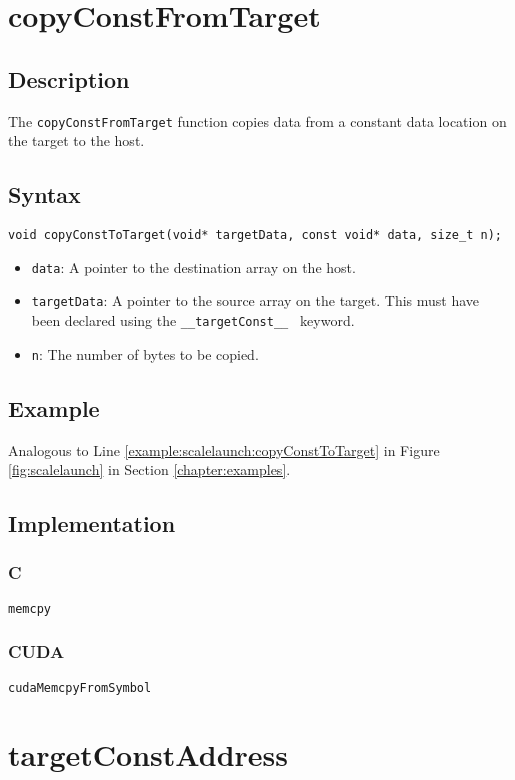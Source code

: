 \newpage
\section{copyConstFromTarget}

\subsection{Description}

The \verb+copyConstFromTarget+ function copies data from a constant data location on the target to the host.

\subsection{Syntax}
\begin{verbatim}
void copyConstToTarget(void* targetData, const void* data, size_t n);
\end{verbatim}

\begin{itemize}
\item \verb+data+: A pointer to the destination array on the host.
\item \verb+targetData+: A pointer to the source array on the target. This must have been declared using the \verb+__targetConst__ + keyword.
\item \verb+n+: The number of bytes to be copied.
\end{itemize}


\subsection{Example}
Analogous to Line \ref{example:scalelaunch:copyConstToTarget} in Figure \ref{fig:scalelaunch} in Section \ref{chapter:examples}.

\subsection{Implementation}
\subsubsection{C}
\verb+memcpy+
\subsubsection{CUDA}
\verb+cudaMemcpyFromSymbol+

\newpage
\section{targetConstAddress}

